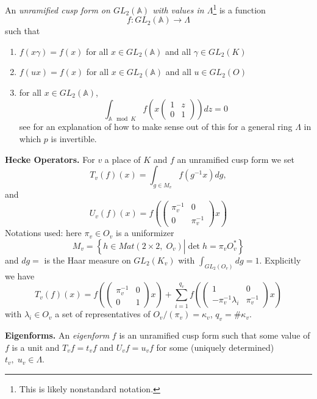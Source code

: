 \begin{definition}
\label{definition-unramified}
An {\it unramified cusp form on $GL_2(\mathbb{A})$ with values in
$\Lambda$}\footnote{This is likely nonstandard notation.}
is a function
$$
f: GL_2(\mathbb{A}) \to \Lambda
$$
such that
\begin{enumerate}
\item $f(x\gamma) = f(x)$ for all $x\in GL_2(\mathbb{A})$ and all
$\gamma\in GL_2(K)$
\item $f(ux) = f(x)$ for all $x\in GL_2(\mathbb{A})$ and all $u\in GL_2(O)$
\item for all $x\in GL_2(\mathbb{A})$,
$$
\int_{\mathbb{A} \mod K} f
\left(x
\left(
\begin{matrix}
1 & z \\
0 & 1
\end{matrix}
\right)
\right) dz = 0
$$
see \cite[Section 4.1]{dJ-conjecture}
for an explanation of how to make sense out
of this for a general ring $\Lambda$ in which $p$ is invertible.
\end{enumerate}
\end{definition}

\medskip\noindent
{\bf Hecke Operators.}
For $v$ a place of $K$ and $f$ an unramified cusp form we set
$$
T_v(f)(x) =
\int_{g\in M_v}f(g^{-1}x)dg,
$$
and
$$
U_v(f)(x) =
f\left(
\left(
\begin{matrix}
\pi_v^{-1} & 0 \\ 0 & \pi_v^{-1}
\end{matrix}
\right)x\right)
$$
Notations used: here $\pi_v \in O_v$ is a uniformizer
$$
M_v =
\left\{
h\in Mat(2\times 2, \; O_v)
\left| \det h = \pi_vO_v^*\right.
\right\}
$$
and $dg=$ is the Haar measure on $GL_2(K_v)$ with
$\int_{GL_2(O_v)} dg = 1$. Explicitly we have
$$
T_v(f)(x) =
f\left(
\left(
\begin{matrix}
\pi_v^{-1}& 0 \\ 0 & 1
\end{matrix}
\right)
x\right) +
\sum_{i=1}^{q_v}
f\left(\left(
\begin{matrix}
1 & 0 \\ -\pi_v^{-1}\lambda_i
& \pi_v^{-1}
\end{matrix}
\right) x\right)
$$
with $\lambda_i\in O_v$ a set of representatives of
$O_v/(\pi_v)=\kappa_v$, $q_v = \#\kappa_v$.

\medskip\noindent
{\bf Eigenforms.} An {\it eigenform} $f$ is an unramified cusp form
such that some value of $f$ is a unit and $T_vf = t_vf$ and
$U_vf = u_vf$ for some (uniquely determined) $t_v, \; u_v \in \Lambda$.

